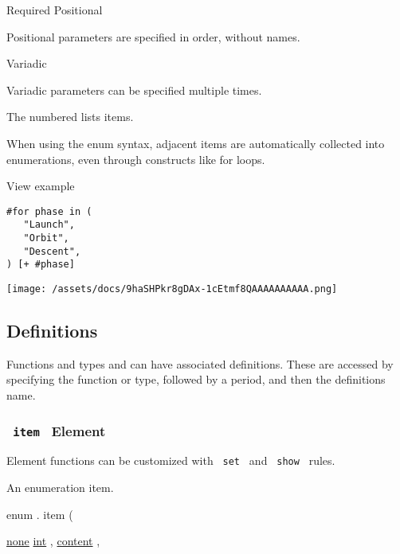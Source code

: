 {Required} {{ Positional }}

\label{parameters-children-positional-tooltip}
Positional parameters are specified in order, without names.

{{ Variadic }}

\label{parameters-children-variadic-tooltip}
Variadic parameters can be specified multiple times.

The numbered list\textquotesingle s items.

When using the enum syntax, adjacent items are automatically collected
into enumerations, even through constructs like for loops.


View example

\begin{verbatim}
#for phase in (
   "Launch",
   "Orbit",
   "Descent",
) [+ #phase]
\end{verbatim}

\texttt{[image: /assets/docs/9haSHPkr8gDAx-1cEtmf8QAAAAAAAAAA.png]}

\subsection{\texorpdfstring{{ Definitions
}}{ Definitions }}\label{definitions}

\label{definitions-tooltip}
Functions and types and can have associated definitions. These are
accessed by specifying the function or type, followed by a period, and
then the definition\textquotesingle s name.

\subsubsection{\texorpdfstring{\texttt{\ item\ } {{ Element
}}}{ item   Element }}\label{definitions-item}

\label{definitions-item-element-tooltip}
Element functions can be customized with \texttt{\ set\ } and
\texttt{\ show\ } rules.

An enumeration item.

enum { . } { item } (

{ \hyperref[definitions-item-parameters-number]{}
\href{/docs/reference/foundations/none/}{none}
\href{/docs/reference/foundations/int/}{int} , } {
\href{/docs/reference/foundations/content/}{content} , }

